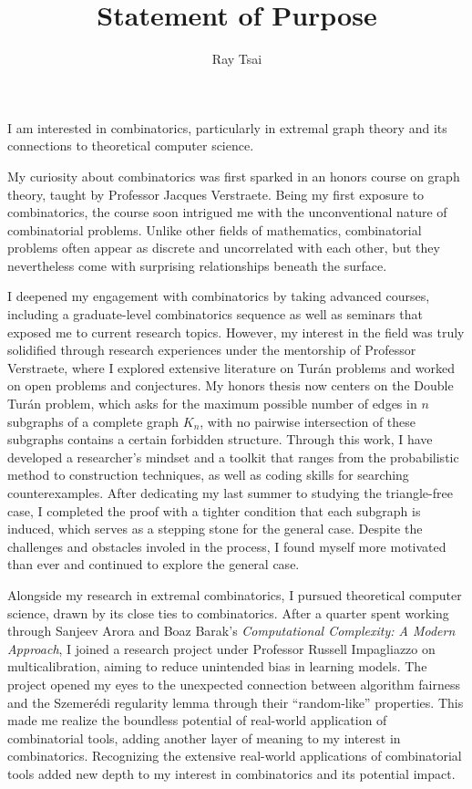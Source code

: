 \documentclass[12pt]{article}
\title{Statement of Purpose}
\author{Ray Tsai}
\date{}
\begin{document}
\maketitle

\vspace{-0.25in}

I am interested in combinatorics, particularly in extremal graph theory and its connections to
theoretical computer science. 

My curiosity about combinatorics was first sparked in an honors course on graph theory, taught by
Professor Jacques Verstraete. Being my first exposure to combinatorics, the course soon intrigued me
with the unconventional nature of combinatorial problems. Unlike other fields of mathematics,
combinatorial problems often appear as discrete and uncorrelated with each other, but they
nevertheless come with surprising relationships beneath the surface.

I deepened my engagement with combinatorics by taking advanced courses, including a graduate-level
combinatorics sequence as well as seminars that exposed me to current research topics. However, my
interest in the field was truly solidified through research experiences under the mentorship of
Professor Verstraete, where I explored extensive literature on Turán problems and worked on open
problems and conjectures. My honors thesis now centers on the Double Turán problem, which asks for
the maximum possible number of edges in $n$ subgraphs of a complete graph $K_n$, with no pairwise
intersection of these subgraphs contains a certain forbidden structure. Through this work, I have
developed a researcher's mindset and a toolkit that ranges from the probabilistic method to
construction techniques, as well as coding skills for searching counterexamples. After dedicating my
last summer to studying the triangle-free case, I completed the proof with a tighter condition that
each subgraph is induced, which serves as a stepping stone for the general case. Despite the
challenges and obstacles involed in the process, I found myself more motivated than ever and
continued to explore the general case.

Alongside my research in extremal combinatorics, I pursued theoretical computer science, drawn by
its close ties to combinatorics. After a quarter spent working through Sanjeev Arora and Boaz
Barak's \textit{Computational Complexity: A Modern Approach}, I joined a research project under
Professor Russell Impagliazzo on multicalibration, aiming to reduce unintended bias in learning
models. The project opened my eyes to the unexpected connection between algorithm fairness and the
Szemerédi regularity lemma through their ``random-like'' properties. This made me realize the
boundless potential of real-world application of combinatorial tools, adding another layer of
meaning to my interest in combinatorics. Recognizing the extensive real-world applications of
combinatorial tools added new depth to my interest in combinatorics and its potential impact. 
\end{document}
